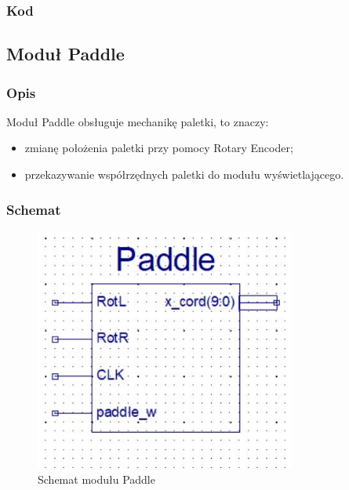 \documentclass[12pt,a4paper]{article}
\begin{document}
\newpage
\subsubsection{Kod}
\lstset{style=vhdl}

\newpage
  
\subsection{Moduł Paddle}
\subsubsection{Opis}
Moduł Paddle obsługuje mechanikę paletki, to znaczy:

\begin{itemize}
    \item zmianę położenia paletki przy pomocy Rotary Encoder;
    \item przekazywanie współrzędnych paletki do modułu wyświetlającego.
\end{itemize}

\subsubsection{Schemat}



\begin{figure}[ht]
    \centering
    \includegraphics[height=8cm]{paddle.JPG}  
    \caption{Schemat modułu Paddle}
    \label{fig:my_label}
\end{figure}
\end{document}
